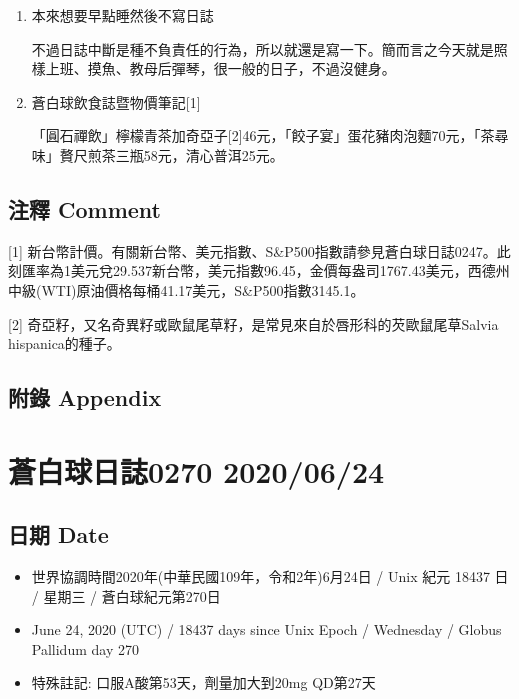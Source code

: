 \documentclass[a5paper, 11pt
]{book}
\providecommand{\tightlist}{%
  \setlength{\itemsep}{0pt}\setlength{\parskip}{0pt}}
\begin{document}
\begin{enumerate}
\def\labelenumi{\arabic{enumi}.}
\item
  本來想要早點睡然後不寫日誌

  不過日誌中斷是種不負責任的行為，所以就還是寫一下。簡而言之今天就是照樣上班、摸魚、教母后彈琴，很一般的日子，不過沒健身。
\item
  蒼白球飲食誌暨物價筆記{[}1{]}

  「圓石禪飲」檸檬青茶加奇亞子{[}2{]}46元，「餃子宴」蛋花豬肉泡麵70元，「茶尋味」贅尺煎茶三瓶58元，清心普洱25元。
\end{enumerate}

\hypertarget{ux6ce8ux91cb-comment-22}{%
\subsection{注釋 Comment}\label{ux6ce8ux91cb-comment-22}}

{[}1{]}
新台幣計價。有關新台幣、美元指數、S\&P500指數請參見蒼白球日誌0247。此刻匯率為1美元兌29.537新台幣，美元指數96.45，金價每盎司1767.43美元，西德州中級(WTI)原油價格每桶41.17美元，S\&P500指數3145.1。

{[}2{]}
奇亞籽，又名奇異籽或歐鼠尾草籽，是常見來自於唇形科的芡歐鼠尾草Salvia
hispanica的種子。

\hypertarget{ux9644ux9304-appendix-22}{%
\subsection{附錄 Appendix}\label{ux9644ux9304-appendix-22}}

\hypertarget{ux84bcux767dux7403ux65e5ux8a8c0270-20200624}{%
\section{蒼白球日誌0270
2020/06/24}\label{ux84bcux767dux7403ux65e5ux8a8c0270-20200624}}

\hypertarget{ux65e5ux671f-date-23}{%
\subsection{日期 Date}\label{ux65e5ux671f-date-23}}

\begin{itemize}
\tightlist
\item
  世界協調時間2020年(中華民國109年，令和2年)6月24日 / Unix 紀元 18437 日
  / 星期三 / 蒼白球紀元第270日
\item
  June 24, 2020 (UTC) / 18437 days since Unix Epoch / Wednesday / Globus
  Pallidum day 270
\item
  特殊註記: 口服A酸第53天，劑量加大到20mg QD第27天
\end{itemize}
\end{document}

